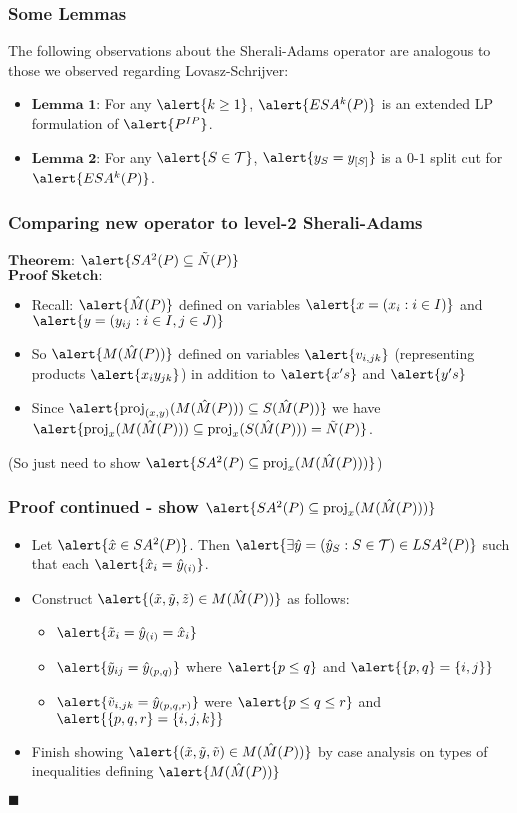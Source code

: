 \documentclass{beamer}
\DeclareMathOperator{\proj}{proj}
\begin{document}
\begin{frame}
\frametitle{Some Lemmas}
The following observations about the Sherali-Adams operator are analogous to those we observed regarding Lovasz-Schrijver:\\
\begin{itemize}
\item$\textbf{Lemma 1:}$ For any $\alert{k \geq 1}$, $\alert{ESA^k(P)}$ is an extended LP formulation of $\alert{P^{IP}}$.
\item$\textbf{Lemma 2:}$ For any $\alert{S \in \mathcal{T}}$, $\alert{y_S = y_{[S]}}$ is a $0$-$1$ split cut for $\alert{ESA^k(P)}$.
\end{itemize}
\end{frame}
\begin{frame}
\frametitle{Comparing new operator to level-2 Sherali-Adams}
$\textbf{Theorem:}$ $\alert{SA^2(P) \subseteq \tilde{N}(P)}$\\
$\textbf{Proof Sketch:}$
\begin{itemize}
\item Recall: $\alert{\hat{M}(P)}$ defined on variables $\alert{x = (x_i : i \in I)}$ and $\alert{y = (y_{ij}: i \in I, j \in J)}$
\item So $\alert{M(\hat{M}(P))}$ defined on variables $\alert{v_{i,jk}}$ (representing products $\alert{x_iy_{jk}}$) in addition to $\alert{x's}$ and $\alert{y's}$
\item Since $\alert{\proj_{(x,y)}(M(\hat{M}(P))) \subseteq S(\hat{M}(P))}$ we have $\alert{\proj_x (M(\hat{M}(P))) \subseteq \proj_x (S(\hat{M}(P))) = \tilde{N}(P)}$.
\end{itemize}
(So just need to show $\alert{SA^2(P) \subseteq \proj_x(M(\hat{M}(P)))}$)
\end{frame}

\begin{frame}
\frametitle{Proof continued - show $\alert{SA^2(P) \subseteq \proj_x(M(\hat{M}(P)))}$}
\begin{itemize}
\item Let $\alert{\hat{x} \in SA^2(P)}$. Then $\alert{\exists \hat{y} = (\hat{y}_S : S \in \mathcal{T}) \in LSA^2(P)}$ such that each $\alert{\hat{x}_i = \hat{y}_{(i)}}$.
\item Construct $\alert{(\tilde{x},\tilde{y},\tilde{z}) \in M(\hat{M}(P))}$ as follows:
\begin{itemize}
\item $\alert{\tilde{x}_i = \hat{y}_{(i)} = \hat{x}_i}$
\item $\alert{\tilde{y}_{ij} = \hat{y}_{(p,q)}}$ where $\alert{p \leq q}$ and $\alert{\{p,q\} = \{i,j\}}$
\item $\alert{\tilde{v}_{i,jk} = \hat{y}_{(p,q,r)}}$ were $\alert{p \leq q \leq r}$ and $\alert{\{p,q,r\} = \{i,j,k\}}$
\end{itemize}
\item Finish showing $\alert{(\tilde{x},\tilde{y}, \tilde{v}) \in M(\hat{M}(P))}$ by case analysis on types of inequalities defining $\alert{M(\hat{M}(P))}$
\end{itemize}
$\blacksquare$
\end{frame}
\end{document}

